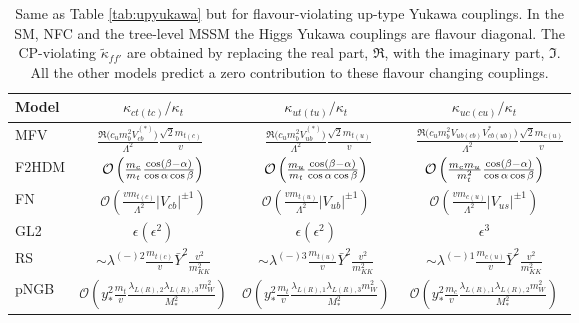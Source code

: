 \documentclass[../report.tex]{subfiles}
\begin{document}
\begin{table}[t]
\begin{center}
\begin{tabular}{l  c  c  c }
\toprule[0.1em]
Model	& $\kappa_{ct (tc)}/\kappa_t$ & $\kappa_{ut (tu)}/\kappa_t$  & $\kappa_{uc (cu)}/\kappa_t$ \\ \midrule[0.05em]\vspace{0.15cm}
MFV &$ \frac{\Re\big( c_u m_b^2 V_{cb}^{(*)}\big)}{\Lambda^2}\frac{\sqrt2 m_{t(c)}}{v} $~&~ $ \frac{\Re\big( c_u m_b^2 V_{ub}^{(*)}\big)}{\Lambda^2} \frac{\sqrt2 m_{t(u)}}{v}$~&~ $ \frac{\Re\big( c_u m_b^2 V_{ub(cb)}V_{cb(ub)}^{*}\big)}{\Lambda^2} \frac{\sqrt2 m_{c(u)}}{v}$\\\vspace{0.15cm}
F2HDM & $\mathcal{O}\left(\frac{m_c}{m_t}\frac{\cos(\beta-\alpha)}{\cos\alpha\cos\beta}\right)$ & $\mathcal{O}\left(\frac{m_u}{m_t}\frac{\cos(\beta-\alpha)}{\cos\alpha\cos\beta}\right)$ & $\mathcal{O}\left(\frac{m_c m_u}{m_t^2}\frac{\cos(\beta-\alpha)}{\cos\alpha\cos\beta}\right)$ \\\vspace{0.15cm}
FN &  $\mathcal{O}\left(\frac{v m_{t(c)}}{\Lambda^2} |V_{cb}|^{\pm 1}\right)$ &
	$\mathcal{O}\left(\frac{v m_{t(u)}}{\Lambda^2} |V_{ub}|^{\pm 1}\right)$ &
	$\mathcal{O}\left(\frac{v m_{c(u)}}{\Lambda^2} |V_{us}|^{\pm 1}\right)$\\\vspace{0.15cm}
GL2	& $\epsilon (\epsilon^2)$ & $\epsilon (\epsilon^2)$ & $\epsilon^3$ \\\vspace{0.15cm}
RS & $\sim \lambda^{(-)2} \frac{m_{t(c)}}{v} \bar Y^2\frac{v^2}{m_{KK}^2} $&$\sim \lambda^{(-)3} \frac{m_{t(u)}}{v} \bar Y^2\frac{v^2}{m_{KK}^2} $&$\sim \lambda^{(-)1} \frac{m_{c(u)}}{v} \bar Y^2\frac{v^2}{m_{KK}^2} $ \\\vspace{0.15cm}
pNGB & ${\mathcal O}(y_*^2 \frac{m_t}{v}\frac{\lambda_{L (R),2} \lambda_{L(R),3}m_W^2}{M_*^2})$ & ${\mathcal O}(y_*^2 \frac{m_t}{v}\frac{\lambda_{L (R),1} \lambda_{L(R),3}m_W^2}{M_*^2})$  & ${\mathcal O}(y_*^2 \frac{m_c}{v}\frac{\lambda_{L (R),1} \lambda_{L(R),2}m_W^2}{M_*^2})$ \\
\bottomrule[0.1em]
\end{tabular}
\caption{Same as Table \ref{tab:upyukawa} but for flavour-violating up-type Yukawa couplings. In the SM,
  NFC and the tree-level MSSM the Higgs Yukawa couplings are flavour
  diagonal. The CP-violating $\tilde \kappa_{ff'}$ are obtained by replacing the real part, ${\Re}$, with the imaginary part, ${\Im}$. All the other models predict a zero contribution to these flavour changing couplings.
}
\label{tab:upFVyukawa}
\end{center}
\end{table}
\end{document}
